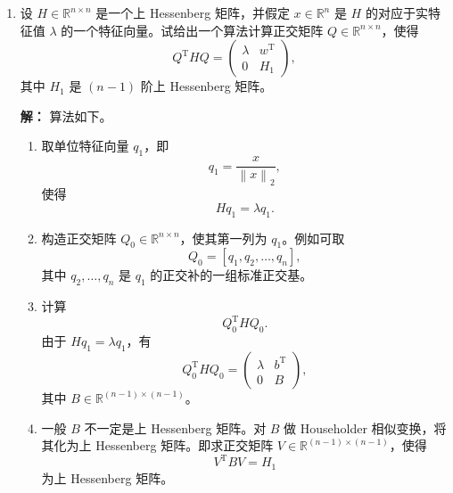 \documentclass[11pt]{article}
\newcommand{\R}{\mathbb{R}}
\renewcommand{\top}{\mathrm{T}}
\newcommand{\norm}[1]{\left\lVert #1 \right\rVert}
\newcommand{\abs}[1]{\left\lvert #1 \right\rvert}
\newenvironment{solution}{\par\noindent\textbf{解：}}{\par}
\begin{document}
\begin{enumerate}
\begin{solution}
下面求 \(\kappa_2(D)\)。因为 \(D\) 是对角矩阵，
\[
\norm{D}_2=\max_{1\leqslant i\leqslant n}\abs{d_i},
\qquad
\norm{D^{-1}}_2=\max_{1\leqslant i\leqslant n}\abs{d_i}^{-1}.
\]
因此
\[
\kappa_2(D)=\norm{D}_2\norm{D^{-1}}_2
=
\left(\max_i\abs{d_i}\right)
\left(\max_i\abs{d_i}^{-1}\right).
\]
又由递推
\[
d_i=\frac{1}{h_{21}h_{32}\cdots h_{i,i-1}},\qquad i=1,\dots,n,
\]
其中空乘积为 \(1\)。因此
\[
\boxed{
\kappa_2(D)
=
\left(\max_{1\leqslant i\leqslant n}\abs{d_i}\right)
\left(\max_{1\leqslant i\leqslant n}\abs{d_i}^{-1}\right),
\qquad
d_i=\frac{1}{\prod_{k=1}^{i-1}h_{k+1,k}}.
}
\]
\end{solution}

\item 设 \(H\in\R^{n\times n}\) 是一个上 Hessenberg 矩阵，并假定
\(x\in\R^n\) 是 \(H\) 的对应于实特征值 \(\lambda\) 的一个特征向量。试给出一个算法计算正交矩阵
\(Q\in\R^{n\times n}\)，使得
\[
Q^{\top}HQ=
\begin{pmatrix}
\lambda&w^{\top}\\
0&H_1
\end{pmatrix},
\]
其中 \(H_1\) 是 \((n-1)\) 阶上 Hessenberg 矩阵。

\begin{solution}
算法如下。

\begin{enumerate}
\item 取单位特征向量 \(q_1\)，即
\[
q_1=\frac{x}{\norm{x}_2},
\]
使得
\[
Hq_1=\lambda q_1.
\]

\item 构造正交矩阵 \(Q_0\in\R^{n\times n}\)，使其第一列为 \(q_1\)。例如可取
\[
Q_0=[q_1,q_2,\dots,q_n],
\]
其中 \(q_2,\dots,q_n\) 是 \(q_1\) 的正交补的一组标准正交基。

\item 计算
\[
Q_0^{\top}HQ_0.
\]
由于 \(Hq_1=\lambda q_1\)，有
\[
Q_0^{\top}HQ_0
=
\begin{pmatrix}
\lambda&b^{\top}\\
0&B
\end{pmatrix},
\]
其中 \(B\in\R^{(n-1)\times(n-1)}\)。

\item 一般 \(B\) 不一定是上 Hessenberg 矩阵。对 \(B\) 做 Householder 相似变换，将其化为上 Hessenberg 矩阵。即求正交矩阵
\(V\in\R^{(n-1)\times(n-1)}\)，使得
\[
V^{\top}BV=H_1
\]
为上 Hessenberg 矩阵。


\end{enumerate}
\end{solution}
\end{enumerate}
\end{document}
